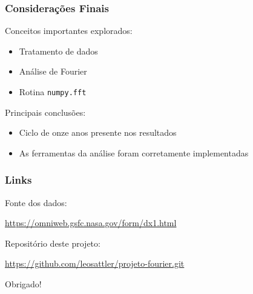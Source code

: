 \documentclass{beamer}
\begin{document}
\begin{frame}
\frametitle{Considerações Finais}
Conceitos importantes explorados:
\begin{itemize}
\item Tratamento de dados
\item Análise de Fourier
\item Rotina \texttt{numpy.fft} 
\end{itemize}
\vspace{2mm}
Principais conclusões:
\begin{itemize}
\item Ciclo de onze anos presente nos resultados
\item As ferramentas da análise foram corretamente implementadas
\end{itemize}
\end{frame}

\begin{frame}
\frametitle{Links}
Fonte dos dados: \\
\begin{center}
\url{https://omniweb.gsfc.nasa.gov/form/dx1.html}
\end{center}
\vspace{2mm}
Repositório deste projeto: \\
\begin{center}
\url{https://github.com/leosattler/projeto-fourier.git}
\end{center}
\vspace{10mm}
\center
Obrigado!
\end{frame}

\end{document}

